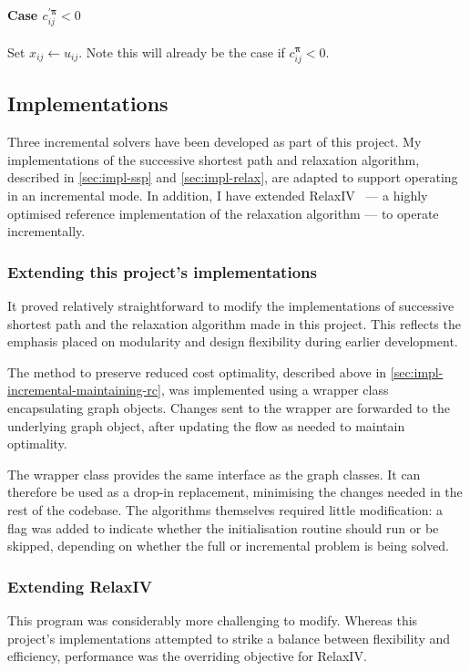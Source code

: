\paragraph{Case $c_{ij}^{\prime\boldsymbol{\pi}} < 0$}
Set $x_{ij} \gets u_{ij}$. Note this will already be the case if $c_{ij}^{\boldsymbol{\pi}} < 0$.

\subsection{Implementations} \label{sec:impl-incremental-impl}

Three incremental solvers have been developed as part of this project. My implementations of the successive shortest path and relaxation algorithm, described in \cref{sec:impl-ssp} and \cref{sec:impl-relax}, are adapted to support operating in an incremental mode. In addition, I have extended RelaxIV~\cite{BertsekasCodes:1988,RelaxIV:2011} --- a highly optimised reference implementation of the relaxation algorithm --- to operate incrementally.

\subsubsection{Extending this project's implementations}
It proved relatively straightforward to modify the implementations of successive shortest path and the relaxation algorithm made in this project. This reflects the emphasis placed on modularity and design flexibility during earlier development.

The method to preserve reduced cost optimality, described above in \cref{sec:impl-incremental-maintaining-rc}, was implemented using a wrapper class encapsulating graph objects. Changes sent to the wrapper are forwarded to the underlying graph object, after updating the flow as needed to maintain optimality. 

The wrapper class provides the same interface as the graph classes. It can therefore be used as a drop-in replacement, minimising the changes needed in the rest of the codebase. The algorithms themselves required little modification: a flag was added to indicate whether the initialisation routine should run or be skipped, depending on whether the full or incremental problem is being solved.
 
\subsubsection{Extending RelaxIV}
This program was considerably more challenging to modify. Whereas this project's implementations attempted to strike a balance between flexibility and efficiency, performance was the overriding objective for RelaxIV.

